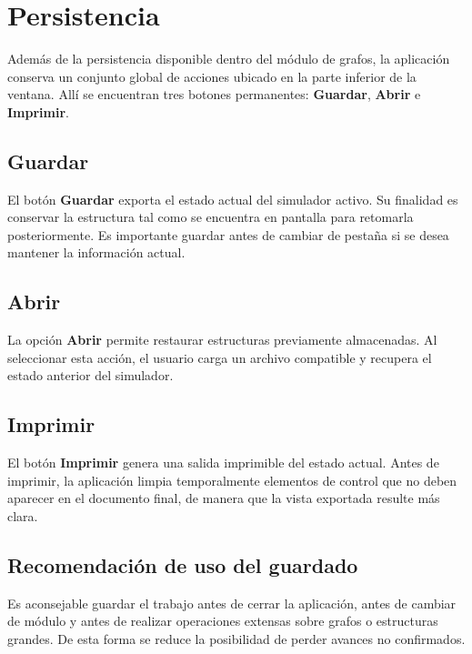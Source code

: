 \documentclass[10pt,onecolumn]{IEEEtran}
\begin{document}
\section{Persistencia}
Además de la persistencia disponible dentro del módulo de grafos, la aplicación conserva un conjunto global de acciones ubicado en la parte inferior de la ventana. Allí se encuentran tres botones permanentes: \textbf{Guardar}, \textbf{Abrir} e \textbf{Imprimir}.

\subsection{Guardar}
El botón \textbf{Guardar} exporta el estado actual del simulador activo. Su finalidad es conservar la estructura tal como se encuentra en pantalla para retomarla posteriormente. Es importante guardar antes de cambiar de pestaña si se desea mantener la información actual.

\subsection{Abrir}
La opción \textbf{Abrir} permite restaurar estructuras previamente almacenadas. Al seleccionar esta acción, el usuario carga un archivo compatible y recupera el estado anterior del simulador.

\subsection{Imprimir}
El botón \textbf{Imprimir} genera una salida imprimible del estado actual. Antes de imprimir, la aplicación limpia temporalmente elementos de control que no deben aparecer en el documento final, de manera que la vista exportada resulte más clara.

\subsection{Recomendación de uso del guardado}
Es aconsejable guardar el trabajo antes de cerrar la aplicación, antes de cambiar de módulo y antes de realizar operaciones extensas sobre grafos o estructuras grandes. De esta forma se reduce la posibilidad de perder avances no confirmados.
\end{document}
